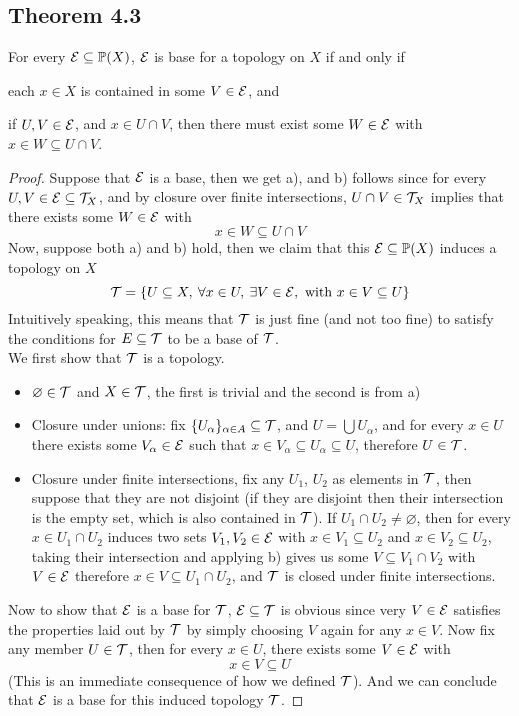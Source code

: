\documentclass[../../main.tex]{subfiles}
\begin{document}
\subsection{Theorem 4.3}
\begin{wts}
    For every $\mathcal{E}\subseteq\mathbb{P}(X)$, $\mathcal{E}$ is base for a topology on $X$ if and only if
    \begin{enumalpha}
        \item each $x\in X$ is contained in some $V\in\mathcal{E}$, and
        \item if $U, V\in\mathcal{E}$, and $x\in U\cap V$, then there must exist some $W\in \mathcal{E}$ with $x\in W\subseteq U\cap V$.
    \end{enumalpha}
\end{wts}
\begin{proof}
    Suppose that $\mathcal{E}$ is a base, then we get a), and b) follows since for every $U, V\in \mathcal{E}\subseteq \mathcal{T}_X$, and by closure over finite intersections, $U\cap V\in\mathcal{T}_X$ implies that there exists some $W\in\mathcal{E}$  with
    \[
    x\in W\subseteq U\cap V
    \]
    Now, suppose both a) and b) hold, then we claim that this $\mathcal{E}\subseteq\mathbb{P}(X)$ induces a topology on $X$
    \[
    \mathcal{T} = \left\{U\subseteq X,\:\forall x\in U,\:\exists V\in \mathcal{E}, \text{ with } x\in V\subseteq U\right\}
    \]
    Intuitively speaking, this means that $\mathcal{T}$ is just fine (and not too fine) to satisfy the conditions for $E\subseteq \mathcal{T}$ to be a base of $\mathcal{T}$.\\
    
    We first show that $\mathcal{T}$ is a topology.
    \begin{itemize}
        \item $\varnothing\in\mathcal{T}$ and $X\in \mathcal{T}$, the first is trivial and the second is from a)
        \item Closure under unions: fix $\{U_\alpha\}_{\alpha\in A}\subseteq \mathcal{T}$, and $U = \bigcup U_\alpha$, and for every $x\in U$ there exists some $V_\alpha\in\mathcal{E}$ such that $x\in V_\alpha\subseteq U_\alpha\subseteq U$, therefore $U\in \mathcal{T}$.
        \item Closure under finite intersections, fix any $U_1$, $U_2$ as elements in $\mathcal{T}$, then suppose that they are not disjoint (if they are disjoint then their intersection is the empty set, which is also contained in $\mathcal{T}$). If $U_1\cap U_2\neq\varnothing$, then for every $x\in U_1\cap U_2$ induces two sets $V_1, V_2\in\mathcal{E}$ with $x\in V_1\subseteq U_2$ and $x\in V_2\subseteq U_2$, taking their intersection and applying b) gives us some $V\subseteq V_1\cap V_2$ with $V\in\mathcal{E}$ therefore $x\in V\subseteq U_1\cap U_2$, and $\mathcal{T}$ is closed under finite intersections.
    \end{itemize}
    Now to show that $\mathcal{E}$ is a base for $\mathcal{T}$, $\mathcal{E}\subseteq\mathcal{T}$ is obvious since very $V\in\mathcal{E}$ satisfies the properties laid out by $\mathcal{T}$ by simply choosing $V$ again for any $x\in V$. Now fix any member $U\in \mathcal{T}$, then for every $x\in U$, there exists some $V\in \mathcal{E}$ with
    \[
    x\in V\subseteq U
    \]
    (This is an immediate consequence of how we defined $\mathcal{T}$). And we can conclude that $\mathcal{E}$ is a base for this induced topology $\mathcal{T}$.
\end{proof}
\end{document}
